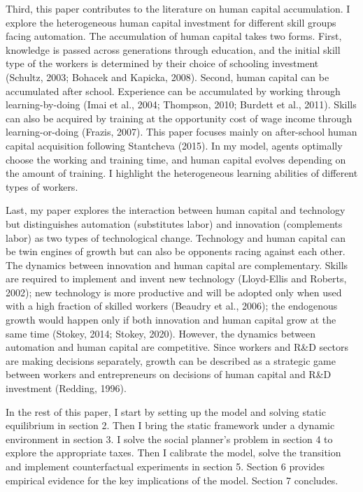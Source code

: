 \documentclass[12pt]{article}
\begin{document}
Third, this paper contributes to the literature on human capital accumulation. I explore the heterogeneous human capital investment for different skill groups facing automation. The accumulation of human capital takes two forms. First, knowledge is passed across generations through education, and the initial skill type of the workers is determined by their choice of schooling investment (Schultz, 2003\nocite{Schultz2003}; Bohacek and Kapicka, 2008\nocite{BohacekKapicka2008}). Second, human capital can be accumulated after school. Experience can be accumulated by working through learning-by-doing (Imai et al., 2004\nocite{Imaietal2004}; Thompson, 2010\nocite{Thompson2010}; Burdett et al., 2011\nocite{Burdettetal2011}). Skills can also be acquired by training at the opportunity cost of wage income through learning-or-doing (Frazis, 2007\nocite{Frazis2007}). This paper focuses mainly on after-school human capital acquisition following Stantcheva (2015)\nocite{Stantcheva2015}. In my model, agents optimally choose the working and training time, and human capital evolves depending on the amount of training. I highlight the heterogeneous learning abilities of different types of workers.

Last, my paper explores the interaction between human capital and technology but distinguishes automation (substitutes labor) and innovation (complements labor) as two types of technological change. Technology and human capital can be twin engines of growth but can also be opponents racing against each other. The dynamics between innovation and human capital are complementary. Skills are required to implement and invent new technology (Lloyd-Ellis and Roberts, 2002\nocite{Lloyd-EllisRoberts2002}); new technology is more productive and will be adopted only when used with a high fraction of skilled workers (Beaudry et al., 2006\nocite{Beaudryetal2006}); the endogenous growth would happen only if both innovation and human capital grow at the same time (Stokey, 2014\nocite{Stokey2014}; Stokey, 2020\nocite{Stokey2020}). However, the dynamics between automation and human capital are competitive. Since workers and R\&D sectors are making decisions separately, growth can be described as a strategic game between workers and entrepreneurs on decisions of human capital and R\&D investment (Redding, 1996\nocite{Redding1996}).

In the rest of this paper, I start by setting up the model and solving static equilibrium in section 2. Then I bring the static framework under a dynamic environment in section 3. I solve the social planner's problem in section 4 to explore the appropriate taxes. Then I calibrate the model, solve the transition and implement counterfactual experiments in section 5. Section 6 provides empirical evidence for the key implications of the model. Section 7 concludes. 
\end{document}
